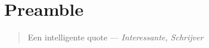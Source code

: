 \chapter*{Preamble}
\begin{quote}
Een intelligente quote
--- \emph{Interessante, Schrijver}
\end{quote}

\section{}
